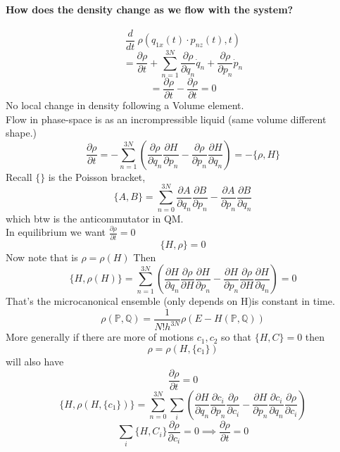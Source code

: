 \documentclass[11pt]{book}
\theoremstyle{definition}
\begin{document}
\paragraph{How does the density change as we flow with the system?}
\[ \frac{d}{dt} \: \rho(q_{1x}(t) \cdot p_{nz}(t), t) \]
\[ = \frac{\partial \rho}{\partial t} + \sum_{n=1}^{3N} \frac{\partial \rho}{\partial q_n} \dot q_n + \frac{\partial \rho}{\partial p_n} \dot p_n\] 
\[  = \frac{\partial \rho }{\partial t} - \frac{\partial \rho}{\partial t}   = 0\] 
No local change in density following a Volume element. \\
Flow in phase-space is as an incrompressible liquid (same volume different shape.) \\
\[ \frac{\partial \rho}{\partial t}  = -\sum_{n=1}^{3N} \left( \frac{\partial \rho}{\partial q_n} \frac{\partial H}{\partial p_n} - \frac{\partial \rho}{\partial p_n} \frac{\partial H}{\partial q_n} \right) = -\{\rho, H\} \] 
Recall $ \{\} $ is the Poisson bracket,
\[ \{A,B\} = \sum_{n=0}^{3N} \frac{\partial A}{\partial q_n} \frac{\partial B}{\partial p_n} - \frac{\partial A}{\partial p_n} \frac{\partial B}{\partial q_n}  \] 
which btw is the anticommutator in QM. \\
In equilibrium we want $ \frac{\partial \rho}{\partial t} = 0 $ 
\[ \{H, \rho\} = 0 \] 
Now note that is $ \rho = \rho(H) $ 
Then 
\[ \{H, \rho(H)\} = \sum_{n=1}^{3N} \left( \frac{\partial H}{\partial q_n} \frac{\partial \rho}{\partial H} \frac{\partial H}{\partial p_n} - \frac{\partial H}{\partial p_n} \frac{\partial \rho}{\partial H} \frac{\partial H}{\partial q_n} \right) = 0  \] 
That's the microcanonical ensemble (only depends on H)is constant in time.
\[ \rho(\mathbb{P},\mathbb{Q}) = \frac{1}{N!h^{3N}} \rho(E - H(\mathbb{P},\mathbb{Q}))\] 
More generally if there are more of motions $ c_1, c_2 $ so that $ \{H,C\} = 0 $ then 
\[ \rho = \rho(H, \{c_1\}) \] will also have \[ \frac{\partial \rho}{\partial t} = 0  \] 
\[ \{H, \rho(H, \{c_1\}) \} = \sum_{n=0}^{3N}\sum_{i} \left( \frac{\partial H}{\partial q_n} \frac{\partial c_i}{\partial p_n} \frac{\partial \rho}{\partial c_i} - \frac{\partial H}{\partial p_n}\frac{\partial c_i}{\partial q_n} \frac{\partial \rho}{\partial c_i}   \right)  \] 
\[ \sum_{i} \{H, C_i\} \frac{\partial \rho}{\partial c_i} = 0 \implies \frac{\partial \rho}{\partial t} = 0 \] 
\end{document}
